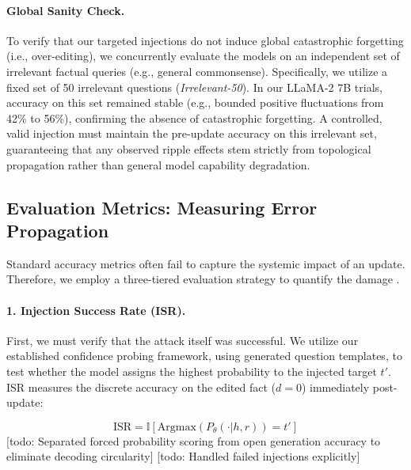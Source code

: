 \paragraph{Global Sanity Check.}
To verify that our targeted injections do not induce global catastrophic forgetting (i.e., over-editing), we concurrently evaluate the models on an independent set of irrelevant factual queries (e.g., general commonsense). Specifically, we utilize a fixed set of 50 irrelevant questions (\textit{Irrelevant-50}). In our LLaMA-2 7B trials, accuracy on this set remained stable (e.g., bounded positive fluctuations from 42\% to 56\%), confirming the absence of catastrophic forgetting. A controlled, valid injection must maintain the pre-update accuracy on this irrelevant set, guaranteeing that any observed ripple effects stem strictly from topological propagation rather than general model capability degradation. 

\subsection{Evaluation Metrics: Measuring Error Propagation}
Standard accuracy metrics often fail to capture the systemic impact of an update. Therefore, we employ a three-tiered evaluation strategy to quantify the damage \cite{meng2022rome, cohen2023ripple}.

\paragraph{1. Injection Success Rate (ISR).}
First, we must verify that the attack itself was successful. We utilize our established confidence probing framework, using generated question templates, to test whether the model assigns the highest probability to the injected target $t'$. ISR measures the discrete accuracy on the edited fact ($d=0$) immediately post-update:

\begin{equation}
    \text{ISR} = \mathbb{I}[\text{Argmax}(P_{\theta}( \cdot | h, r)) = t']
\end{equation}
[todo: Separated forced probability scoring from open generation accuracy to eliminate decoding circularity] [todo: Handled failed injections explicitly]


